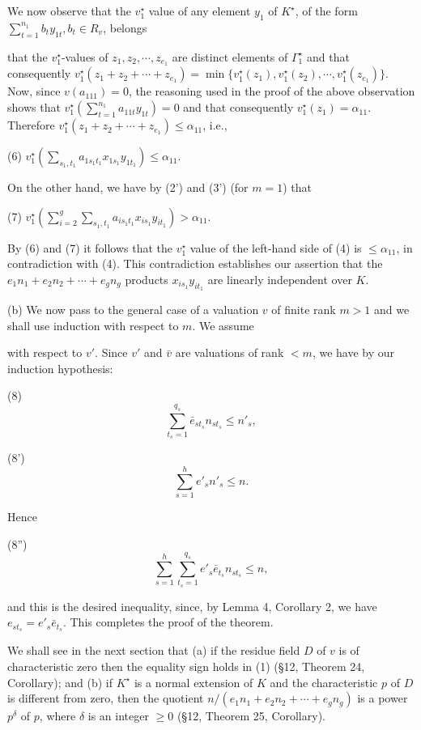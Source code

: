 We now observe that the $v_1^\star$ value of any element $y_1$ of $K^\star$, of the form $\sum_{t=1}^{n_1} b_ty_{1t}, b_t \in R_v$, belongs

that the $v_1^\star$-values of $z_1, z_2, \cdots, z_{e_1}$ are distinct elements of $\Gamma_1^\star$ and that consequently $v_1^\star(z_1 + z_2 + \cdots + z_{e_1}) = \min \{v_1^\star(z_1), v_1^\star(z_2), \cdots, v_1^\star(z_{e_1})\}$. Now, since $v(a_{111}) = 0$, the reasoning used in the proof of the above observation shows that $v_1^\star\left(\sum_{t=1}^{n_1} a_{11t} y_{1t}\right) = 0$ and that consequently $v_1^\star(z_1) = \alpha_{11}$. Therefore $v_1^\star(z_1 + z_2 + \cdots + z_{e_1}) \leq \alpha_{11}$, i.e.,

(6) $v_1^\star\left(\sum_{s_1,t_1} a_{1s_1t_1} x_{1s_1} y_{1t_1}\right) \leq \alpha_{11}$.

On the other hand, we have by (2') and (3') (for $m = 1$) that

(7) $v_1^\star\left(\sum_{i=2}^{g} \sum_{s_1,t_1} a_{is_1t_1} x_{is_1} y_{it_1}\right) > \alpha_{11}$.

By (6) and (7) it follows that the $v_1^\star$ value of the left-hand side of (4) is $\leq \alpha_{11}$, in contradiction with (4). This contradiction establishes our assertion that the $e_1n_1 + e_2n_2 + \cdots + e_gn_g$ products $x_{is_1} y_{it_1}$ are linearly independent over $K$.

(b) We now pass to the general case of a valuation $v$ of finite rank $m > 1$ and we shall use induction with respect to $m$. We assume

with respect to $v'$. Since $v'$ and $\bar{v}$ are valuations of rank $< m$, we have by our induction hypothesis:

(8) $$\sum_{t_s=1}^{q_s} \bar{e}_{st_s} n_{st_s} \leq n'_s,$$

(8') $$\sum_{s=1}^{h} e'_s n'_s \leq n.$$

Hence

(8'') $$\sum_{s=1}^{h} \sum_{t_s=1}^{q_s} e'_s \bar{e}_{t_s} n_{st_s} \leq n,$$

and this is the desired inequality, since, by Lemma 4, Corollary 2, we have $e_{st_s} = e'_s \bar{e}_{t_s}$. This completes the proof of the theorem.

We shall see in the next section that (a) if the residue field $D$ of $v$ is of characteristic zero then the equality sign holds in (1) (§12, Theorem 24, Corollary); and (b) if $K^\star$ is a normal extension of $K$ and the characteristic $p$ of $D$ is different from zero, then the quotient $n/(e_1 n_1 + e_2 n_2 + \cdots + e_g n_g)$ is a power $p^\delta$ of $p$, where $\delta$ is an integer $\geq 0$ (§12, Theorem 25, Corollary).

